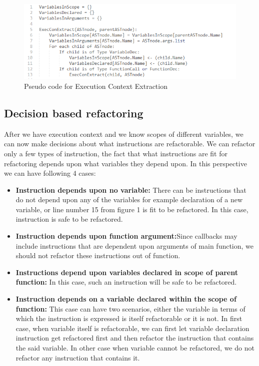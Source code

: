 \documentclass[10pt,conference]{IEEEtran}
\begin{document}
\begin{figure}[htbp]
	\includegraphics[scale=0.5]{code-execcon-extract.png}
	\caption{Pseudo code for Execution Context Extraction}
	\label{fig}
\end{figure}

\subsection{Decision based refactoring}
After we have execution context and we know scopes of different variables, we can now make decisions about what instructions are refactorable. We can refactor only a few types of instruction, the fact that what instructions are fit for refactoring depends upon what variables they depend upon. In this perspective we can have following 4 cases:
\begin{itemize}
	\item {\textbf{Instruction depends upon no variable:}
		There can be instructions that do not depend upon any of the variables for example declaration of a new variable, or line number 15 from figure 1 is fit to be refactored. In this case, instruction is safe to be refactored.}
	\item{\textbf{Instruction depends upon function argument:}Since callbacks may include instructions that are dependent upon arguments of main function, we should not refactor these instructions out of function.}
	\item{\textbf{Instructions depend upon variables declared in scope of parent function:}
		In this case, such an instruction will be safe to be refactored.}
	\item{\textbf{Instruction depends on a variable declared within the scope of function:}
		This case can have two scenarios, either the variable in terms of which the instruction is expressed is itself refactorable or it is not. In first case, when variable itself is refactorable, we can first let variable declaration instruction get refactored first and then refactor the instruction that contains the said variable.
		In other case when variable cannot be refactored, we do not refactor any instruction that contains it.}
\end{itemize}
\end{document}
